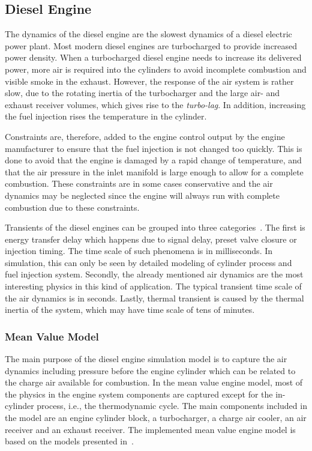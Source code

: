 \documentclass[journal]{IEEEtran}
\begin{document}
\subsection{Diesel Engine}
\label{sec:dieselengine}
The dynamics of the diesel engine are the slowest dynamics of a diesel electric power plant. 
Most modern diesel engines are turbocharged to provide increased power density. 
When a turbocharged diesel engine needs to increase its delivered power, more air is required into the cylinders to avoid incomplete combustion and visible smoke in the exhaust.
However, the response of the air system is rather slow, due to the rotating inertia of the turbocharger and the large air- and exhaust receiver volumes, which gives rise to the \textit{turbo-lag}.
In addition, increasing the fuel injection rises the temperature in the cylinder.

Constraints are, therefore, added to the engine control output by the engine manufacturer to ensure that the fuel injection is not changed too quickly.
This is done to avoid that the engine is damaged by a rapid change of temperature, and that the air pressure in the inlet manifold is large enough to allow for a complete combustion. 
These constraints are in some cases conservative and the air dynamics may be neglected since the engine will always run with complete combustion due to these constraints.

Transients of the diesel engines can be grouped into three categories~\cite{Benajes2002}. 
The first is energy transfer delay which happens due to signal delay, preset valve closure or injection timing. 
The time scale of such phenomena is in milliseconds. 
In simulation, this can only be seen by detailed modeling of cylinder process and fuel injection system. 
Secondly, the already mentioned air dynamics are the most interesting physics in this kind of application. 
The typical transient time scale of the air dynamics is in seconds. 
Lastly, thermal transient is caused by the thermal inertia of the system, which may have time scale of tens of minutes. 

\subsubsection{Mean Value Model}
The main purpose of the diesel engine simulation model is to capture the air dynamics including pressure before the engine cylinder which can be related to the charge air available for combustion. 
In the mean value engine model, most of the physics in the engine system components are captured except for the in-cylinder process, i.e., the thermodynamic cycle. 
The main components included in the model are an engine cylinder block, a turbocharger, a charge air cooler, an air receiver and an exhaust receiver. 
The implemented mean value engine model is based on the models presented in~\cite{Guzzella2010,Chow1999,Heywood1988,Zacharias1967,Yum2013,Pedersen2000}.
\end{document}
